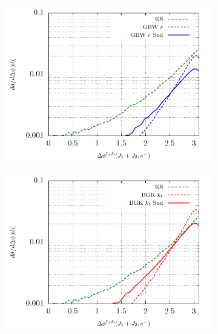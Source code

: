 \documentclass[11pt]{article}
\numberwithin{equation}{section}
\numberwithin{table}{section}
\numberwithin{figure}{section}
\begin{document}
\begin{figure}[p]
\begin{subfigure}{0.5\textwidth}
	\end{subfigure}
	\begin{subfigure}{0.5\textwidth}
		\includegraphics[width=\textwidth]{plots/plotGBW3Lab}
	\end{subfigure}
	\begin{subfigure}{0.5\textwidth}
		\includegraphics[width=\textwidth]{plots/plotBGK2Lab}
	\end{subfigure}
	\begin{subfigure}{0.5\textwidth}

\end{subfigure}
\end{figure}
\end{document}
